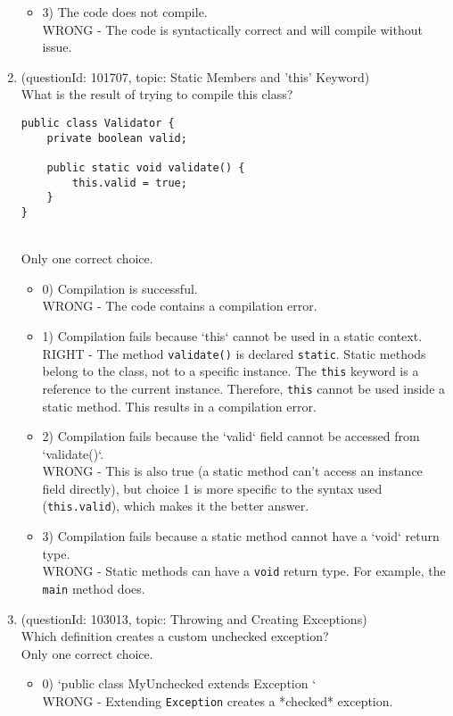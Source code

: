 \documentclass[12pt]{article}
\begin{document}
\begin{enumerate}[label=(\arabic*)]
\begin{itemize}
\item 3) The code does not compile.
 \\ 
WRONG - The code is syntactically correct and will compile without issue.

\end{itemize}
\item (questionId: 101707, topic: Static Members and 'this' Keyword) \\ 
What is the result of trying to compile this class?\n\begin{verbatim}
public class Validator {
    private boolean valid;

    public static void validate() {
        this.valid = true;
    }
}
\end{verbatim}
\\ \noindent Only one correct choice. 
\begin{itemize}
\item 0) Compilation is successful.
 \\ 
WRONG - The code contains a compilation error.

\item 1) Compilation fails because `this` cannot be used in a static context.
 \\ 
RIGHT - The method \verb|validate()| is declared \verb|static|. Static methods belong to the class, not to a specific instance. The \verb|this| keyword is a reference to the current instance. Therefore, \verb|this| cannot be used inside a static method. This results in a compilation error.

\item 2) Compilation fails because the `valid` field cannot be accessed from `validate()`.
 \\ 
WRONG - This is also true (a static method can't access an instance field directly), but choice 1 is more specific to the syntax used (\verb|this.valid|), which makes it the better answer.

\item 3) Compilation fails because a static method cannot have a `void` return type.
 \\ 
WRONG - Static methods can have a \verb|void| return type. For example, the \verb|main| method does.

\end{itemize}
\item (questionId: 103013, topic: Throwing and Creating Exceptions) \\ 
Which definition creates a custom unchecked exception?
\\ \noindent Only one correct choice. 
\begin{itemize}
\item 0) `public class MyUnchecked extends Exception { }`
 \\ 
WRONG - Extending \verb|Exception| creates a *checked* exception.


\end{itemize}
\end{enumerate}
\end{document}
